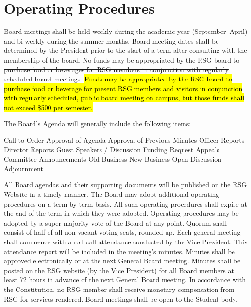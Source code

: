 \section{Operating Procedures}
\begin{enumsubsection}
\itemnotoc Board meetings shall be held weekly during the academic year 
(September--April) and bi-weekly during the summer months. Board 
meeting dates shall be determined by the President prior to the start 
of a term after consulting with the membership of the board.
\itemnotoc \st{No funds may be appropriated by the RSG board to purchase food or 
beverages for RSG members in conjunction with regularly scheduled 
board meetings.}  \hl{Funds may be appropriated by the RSG board to purchase food or beverage for  present RSG members and visitors in conjunction with regularly scheduled, public board meeting on campus, but those funds shall not exceed \$500 per semester.}

\itemnotoc The Board's Agenda will generally include the following items:
\begin{enumsubsubsection}
\itemnotoc Call to Order
\itemnotoc Approval of Agenda
\itemnotoc Approval of Previous Minutes
\itemnotoc Officer Reports
\itemnotoc Director Reports
\itemnotoc Guest Speakers / Discussion
\itemnotoc Funding Request Appeals
\itemnotoc Committee Announcements
\itemnotoc Old Business
\itemnotoc New Business
\itemnotoc Open Discussion
\itemnotoc Adjournment
\end{enumsubsubsection}
\itemnotoc All Board agendas and their supporting documents will be published 
on the RSG Website in a timely manner.
\itemnotoc The Board may adopt additional operating procedures on a term-by-term basis. All such operating procedures shall expire at the end of 
the term in which they were adopted. Operating procedures may be 
adopted by a super-majority vote of the Board at any point.
 Quorum shall consist of half of all non-vacant voting seats,
rounded up. 
 Each general meeting shall commence with a roll call 
attendance conducted by the Vice President. This attendance report 
will be included in the meeting's minutes. 
 Minutes shall be approved electronically or at the next 
General Board meeting. Minutes shall be posted on the RSG website 
(by the Vice President) for all Board members at least 72 hours in 
advance of the next General Board meeting. 
\itemnotoc In accordance with the Constitution, no RSG member shall receive 
monetary compensation from RSG for services rendered.
\itemnotoc Board meetings shall be open to the Student body.
\end{enumsubsection}